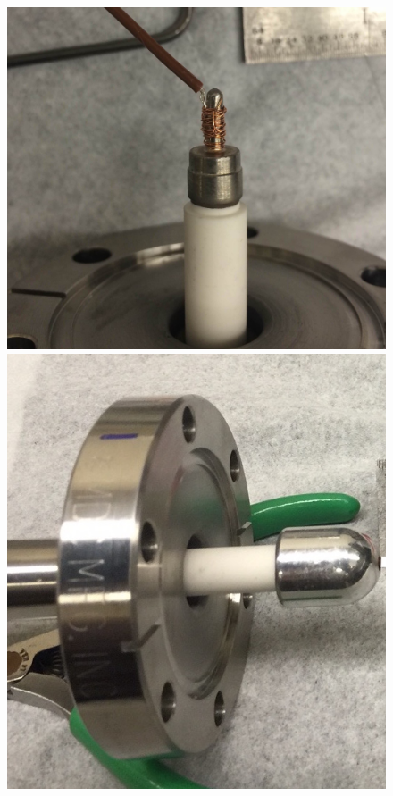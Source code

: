 \begin{figure}[htbp]
    \vspace*{1cm} %

    \begin{minipage}{0.47\textwidth}
    \includegraphics[width=\linewidth]{figures/testbed/ft3_3.jpg}
    \end{minipage}
    \hspace{\fill} %
    \begin{minipage}{0.47\textwidth}
    \includegraphics[width=\linewidth]{figures/testbed/ft3_4.jpg}

\end{minipage}
\end{figure}
